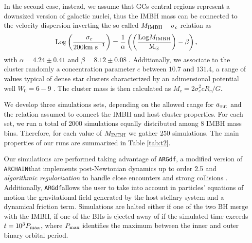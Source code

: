 \documentclass[useAMS,usenatbib]{mn2e}
\newcommand{\Log}{{\rm Log}}
\newcommand{\Ms}{{\rm M}_\odot}
\newcommand{\ibh}{{\rm IMBH}}
\newcommand{\out}{{\rm out}}
\newcommand{\ARGdf}{\texttt{ARGdf}}
\newcommand{\ARCHAIN}{\texttt{ARCHAIN}}
\begin{document}
In the second case, instead, we assume that GCs central regions represent a downsized version of galactic nuclei, thus the IMBH mass can be connected to the velocity dispersion inverting the so-called $M_\ibh - \sigma_c$ relation as 
\begin{equation}
     \Log \left(\frac{\sigma_c}{200{\rm km~s}^{-1}}\right) = \frac{1}{\alpha}\left(\left(\frac{\Log M_\ibh}{\Ms}\right) - \beta\right) ,
\end{equation}
with $\alpha = 4.24\pm0.41$ and $\beta=8.12\pm 0.08$ \citep{gultekin09}. Additionally, we associate to the cluster randomly a concentration parameter $c$ between $10.7$ and $131.4$, a range of values typical of dense star clusters characterized by an adimensional potential well $W_0 = 6-9$ \citep{king62}. The cluster mass is then calculated as $M_c = 2\sigma_c^2 c R_c / G$.

We develop three simulations sets, depending on the allowed range for $a_\out$ and the relation assumed to connect the IMBH and host cluster properties. For each set, we run a total of 2000 simulations equally distributed among 8 IMBH mass bins. Therefore, for each value of $M_\ibh$ we gather 250 simulations. The main properties of our runs are summarized in Table \ref{tab:t2}.

Our simulations are performed taking advantage of \ARGdf \citep{ASCD19}, a modified version of \ARCHAIN that implements post-Newtonian dynamics up to order 2.5 and {\it algorithmic regularization} to handle close encounters and strong collisions \citep{mikkola99,mikkola08}. Additionally, \ARGdf allows the user to take into account in particles' equations of motion the gravitational field generated by the host stellary system and a dynamical friction term. Simulations are halted either if one of the two BH merge with the IMBH, if one of the BHs is ejected away of if the simulated time exceeds $t = 10^3 P_{\rm max}$, where $P_{\rm max}$ identifies the maximum between the inner and outer binary orbital period.
\end{document}
